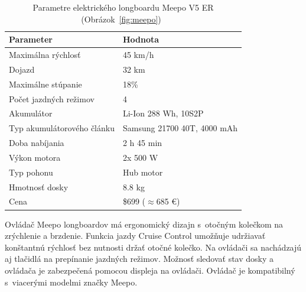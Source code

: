 \begin{table}[h]
    \centering
    \begin{tabular}{|l|l|}
        \hline
        \textbf{Parameter} & \textbf{Hodnota} \\ \hline
        Maximálna rýchlosť & 45 km/h \\ \hline
        Dojazd & 32 km \\ \hline
        Maximálne stúpanie & 18\% \\ \hline
        Počet jazdných režimov & 4 \\ \hline
        Akumulátor & Li-Ion 288 Wh, 10S2P \\ \hline
        Typ akumulátorového článku & Samsung 21700 40T, 4000 mAh \\ \hline
        Doba nabíjania & 2 h 45 min \\ \hline
        Výkon motora & 2x 500 W \\ \hline
        Typ pohonu & Hub motor \\ \hline
        Hmotnosť dosky & 8.8 kg \\ \hline
        Cena & \$699 ($\approx$685 €) \\ \hline
    \end{tabular}
    \caption{Parametre elektrického longboardu Meepo V5 ER (Obrázok~\ref{fig:meepo})~\cite{Meepo}}\label{tab:meepo}
\end{table}

Ovládač Meepo longboardov má ergonomický dizajn s~otočným kolečkom na zrýchlenie a brzdenie.
Funkcia jazdy Cruise Control umožňuje udržiavať konštantnú rýchlosť bez nutnosti držať otočné kolečko.
Na ovládači sa nachádzajú aj tlačidlá na prepínanie jazdných režimov.
Možnosť sledovať stav dosky a ovládača je zabezpečená pomocou displeja na ovládači.
Ovládač je kompatibilný s~viacerými modelmi značky Meepo.

